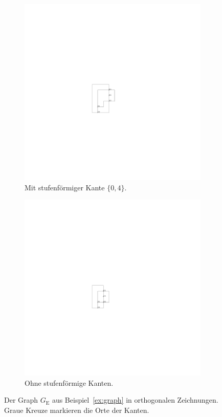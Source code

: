 \documentclass[a4paper]{scrreprt}
\theoremstyle{definition}
\begin{document}
\begin{figure}[h]
  \centering
\begin{subfigure}[b]{0.4\textwidth}
  \centering
  \includegraphics{exampleA/orthogonalNocompress}
  \caption{Mit stufenförmiger Kante $\{0,4\}$.}
  \label{fig:exampleAorthogonalNocompress}
\end{subfigure}
  \quad
\begin{subfigure}[b]{0.4\textwidth}
  \centering
  \includegraphics{exampleA/orthogonalCompress}
  \caption{Ohne stufenförmige Kanten.}
  \label{fig:exampleAorthogonalCompress}
\end{subfigure}

  \caption{Der Graph $G_\text{E}$ aus Beispiel~\ref{ex:graph} in orthogonalen Zeichnungen. Graue Kreuze markieren die Orte der Kanten.}
  \label{fig:exampleAorthogonal}
\end{figure}
\end{document}
